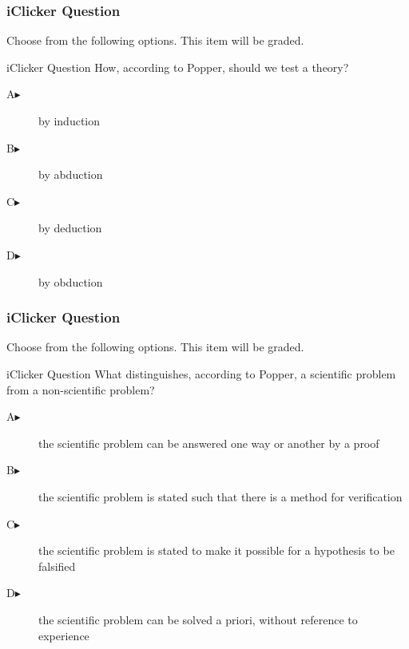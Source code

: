 \documentclass[xcolor=dvipsnames]{beamer}
\begin{document}
\begin{frame}
  \frametitle{iClicker Question}
Choose from the following options. This item will be graded.
\begin{block}{iClicker Question}
How, according to Popper, should we test a theory?
\end{block}
\begin{description}
\item[A\hspace{.2in}$\blacktriangleright$] by induction
\item[B\hspace{.2in}$\blacktriangleright$] by abduction
\item[C\hspace{.2in}$\blacktriangleright$] by deduction
\item[D\hspace{.2in}$\blacktriangleright$] by obduction
\end{description}
\end{frame}

\begin{frame}
  \frametitle{iClicker Question}
Choose from the following options. This item will be graded.
\begin{block}{iClicker Question}
What distinguishes, according to Popper, a scientific problem from a
non-scientific problem?
\end{block}
\begin{description}
\item[A\hspace{.2in}$\blacktriangleright$] the scientific problem can
  be answered one way or another by a proof
\item[B\hspace{.2in}$\blacktriangleright$] the scientific problem is
  stated such that there is a method for verification
\item[C\hspace{.2in}$\blacktriangleright$] the scientific problem is
  stated to make it possible for a hypothesis to be falsified
\item[D\hspace{.2in}$\blacktriangleright$] the scientific problem can
  be solved a priori, without reference to experience
\end{description}
\end{frame}
\end{document}
